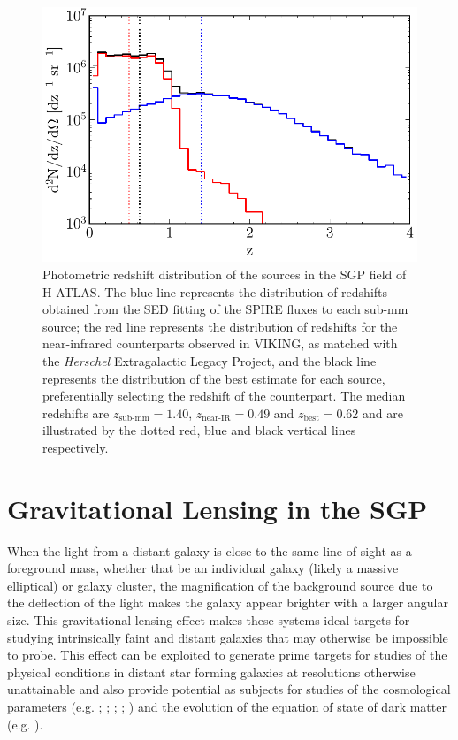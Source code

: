 \begin{figure}
    \centering
    \includegraphics[width=0.75\columnwidth]{Figures/redshift_distribution.pdf}
    \caption{Photometric redshift distribution of the sources in the SGP field of H-ATLAS. The blue line represents the distribution of redshifts obtained from the SED fitting of the SPIRE fluxes to each sub-mm source; the red line represents the distribution of redshifts for the near-infrared counterparts observed in VIKING, as matched with the \textit{Herschel} Extragalactic Legacy Project, and the black line represents the distribution of the best estimate for each source, preferentially selecting the redshift of the counterpart. The median redshifts are $z_{\textrm{sub-mm}} = 1.40$, $z_{\textrm{near-IR}} = 0.49$ and $z_{\textrm{best}} = 0.62$ and are illustrated by the dotted red, blue and black vertical lines respectively.}
    \label{fig:redshift_distribution}
\end{figure}

\section{Gravitational Lensing in the SGP}

When the light from a distant galaxy is close to the same line of sight as a foreground mass, whether that be an individual galaxy (likely a massive elliptical) or galaxy cluster, the magnification of the background source due to the deflection of the light makes the galaxy appear brighter with a larger angular size. This gravitational lensing effect makes these systems ideal targets for studying intrinsically faint and distant galaxies that may otherwise be impossible to probe. This effect can be exploited to generate prime targets for studies of the physical conditions in distant star forming galaxies at resolutions otherwise unattainable and also provide potential as subjects for studies of the cosmological parameters (e.g. \citealt{Kochanek_1992}; \citealt{Kochanek_1996}; \citealt{Grillo_2008}; \citealt{Oguri_2012}; \citealt{Eales_2015}) and the evolution of the equation of state of dark matter (e.g. \citealt{Zhang_2009}). 

